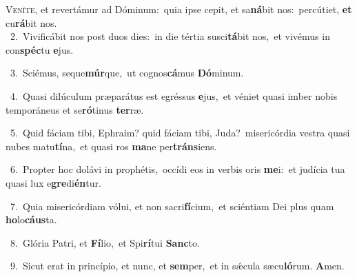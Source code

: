 \lettrine{\initial\textcolor{\initialcolor}{V}}{eníte,} et revertámur ad Dóminum:~\dagger quia ipse cepit, et sa\-\textbf{ná}\-bit nos:~\star percútiet, \textbf{et} cu\-\textbf{rá}\-bit nos.\\
{\numbfont\textcolor{\numbcolor}{~2.}}~Vivificábit nos post duos dies:~\dagger in die tértia susci\-\textbf{tá}\-bit nos,~\star et vivémus in con\-\textbf{spéc}\-tu \textbf{e}\-jus.\par
{\numbfont\textcolor{\numbcolor}{~3.}}~Sciémus, seque\-\textbf{múr}\-que,~\star ut cognos\-\textbf{cá}\-mus \textbf{Dó}\-minum.\par
{\numbfont\textcolor{\numbcolor}{~4.}}~Quasi dilúculum præparátus est egréssus \textbf{e}\-jus,~\star et véniet quasi imber nobis temporáneus et se\-\textbf{ró}\-tinus \textbf{ter}\-ræ.\par
{\numbfont\textcolor{\numbcolor}{~5.}}~Quid fáciam tibi, Ephraim? quid fáciam tibi, Juda?~\dagger misericórdia vestra quasi nubes matu\-\textbf{tí}\-na,~\star et quasi ros \textbf{ma}\-ne per\-\textbf{tráns}\-iens.\par
{\numbfont\textcolor{\numbcolor}{~6.}}~Propter hoc dolávi in prophétis,~\dagger occídi eos in verbis oris \textbf{me}\-i:~\star et judícia tua quasi lux e\-\textbf{gre}\-di\-\textbf{én}\-tur.\par
{\numbfont\textcolor{\numbcolor}{~7.}}~Quia misericórdiam vólui, et non sacri\-\textbf{fí}\-cium,~\star et sciéntiam Dei plus quam \textbf{ho}\-lo\-\textbf{cáus}\-ta.\par
{\numbfont\textcolor{\numbcolor}{~8.}}~Glória Patri, et \textbf{Fí}\-lio,~\star et Spi\-\textbf{rí}\-tui \textbf{Sanc}\-to.\par
{\numbfont\textcolor{\numbcolor}{~9.}}~Sicut erat in princípio, et nunc, et \textbf{sem}\-per,~\star et in sǽcula sæcu\-\textbf{ló}\-rum. \textbf{A}\-men.\par
